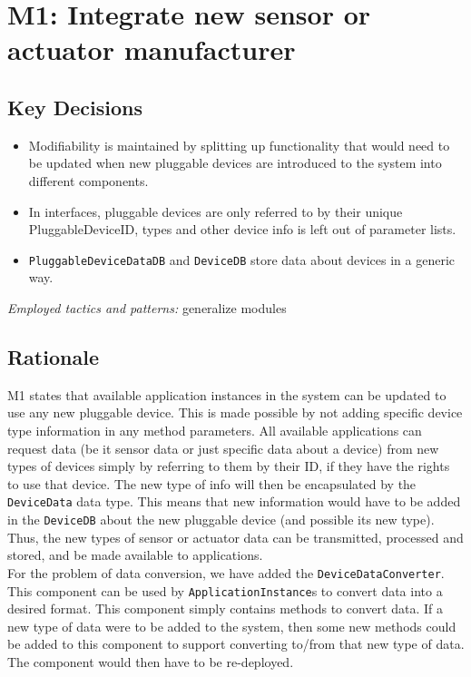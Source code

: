 \section{M1: Integrate new sensor or actuator manufacturer}

    \subsection*{Key Decisions}

    \begin{itemize}
    	\item Modifiability is maintained by splitting up functionality that would need to be updated
              when new pluggable devices are introduced to the system into different components.
        \item In interfaces, pluggable devices are only referred to by their unique PluggableDeviceID,
              types and other device info is left out of parameter lists.
        \item \texttt{PluggableDeviceDataDB} and \texttt{DeviceDB} store data about devices in
              a generic way.
    \end{itemize}
    \emph{Employed tactics and patterns:} generalize modules

    \subsection*{Rationale}
        M1 states that available application instances in the system can be updated to use any new pluggable device.
        This is made possible by not adding specific device type information in any method parameters.
        All available applications can request data (be it sensor data or just specific data about a device)
        from new types of devices simply by referring to them by their ID, if they have the rights
        to use that device. The new type of info will then be encapsulated by the \texttt{DeviceData} data type.
        This means that new information would have to be added in the \texttt{DeviceDB} about the
        new pluggable device (and possible its new type). \\
        Thus, the new types of sensor or actuator data can be transmitted,
        processed and stored, and be made available to applications.\\

        For the problem of data conversion, we have added the \texttt{DeviceDataConverter}.
        This component can be used by \texttt{ApplicationInstance}s to convert data into
        a desired format. This component simply contains methods to convert data.
        If a new type of data were to be added to the system, then some new methods
        could be added to this component to support converting to/from that new
        type of data. The component would then have to be re-deployed.\\

